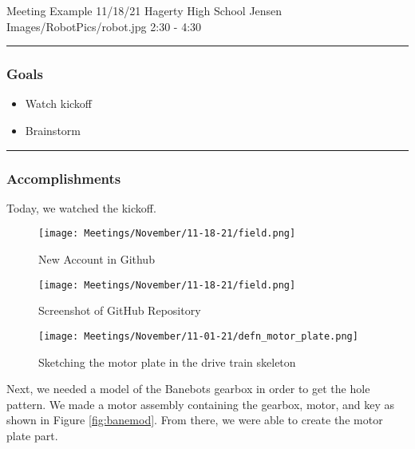 \insertmeeting 
	{Meeting Example} 
	{11/18/21}
	{Hagerty High School}
	{Jensen}
	{Images/RobotPics/robot.jpg}
	{2:30 - 4:30}
	
\noindent\hfil\rule{\textwidth}{.4pt}\hfil
\subsubsection*{Goals}
\begin{itemize}
    \item Watch kickoff
    \item Brainstorm   

\end{itemize} 

\noindent\hfil\rule{\textwidth}{.4pt}\hfil

\subsubsection*{Accomplishments}
Today, we watched the kickoff.
 

\begin{figure}[ht]
\centering
\begin{minipage}[b]{.48\textwidth}
  \centering
  \texttt{[image: Meetings/November/11-18-21/field.png]}
  \caption{New Account in Github}
  \label{fig:pic1}
\end{minipage}%
\hfill%
\begin{minipage}[b]{.48\textwidth}
  \centering
  \texttt{[image: Meetings/November/11-18-21/field.png]}
  \caption{Screenshot of GitHub Repository}
  \label{fig:pic2}
\end{minipage}
\end{figure}

\begin{figure}[htp]
\centering
\texttt{[image: Meetings/November/11-01-21/defn\_motor\_plate.png]}
\caption{Sketching the motor plate in the drive train skeleton}
\label{fig:pic3}
\end{figure}

Next, we needed a model of the Banebots gearbox in order to get the hole pattern. We made a motor assembly containing the gearbox, motor, and key as shown in Figure \ref{fig:banemod}. From there, we were able to create the motor plate part.

